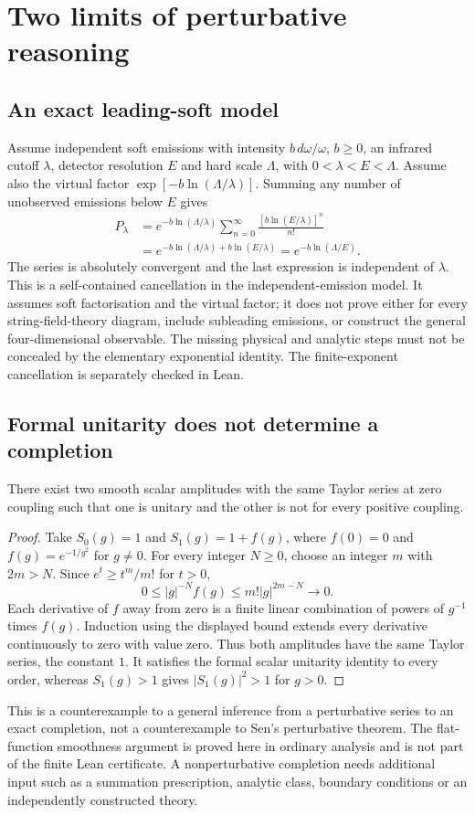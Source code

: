 \section{Two limits of perturbative reasoning}\label{app:perturbative}

\subsection{An exact leading-soft model}
Assume independent soft emissions with intensity $b\,d\omega/\omega$, $b\ge0$, an infrared cutoff $\lambda$, detector resolution $E$ and hard scale $\Lambda$, with $0<\lambda<E<\Lambda$. Assume also the virtual factor $\exp[-b\ln(\Lambda/\lambda)]$. Summing any number of unobserved emissions below $E$ gives
\begin{align}
P_\lambda&=e^{-b\ln(\Lambda/\lambda)}\sum_{n=0}^{\infty}
\frac{[b\ln(E/\lambda)]^n}{n!}\nonumber\\
&=e^{-b\ln(\Lambda/\lambda)+b\ln(E/\lambda)}
=e^{-b\ln(\Lambda/E)}.
\end{align}
The series is absolutely convergent and the last expression is independent of $\lambda$. This is a self-contained cancellation in the independent-emission model. It assumes soft factorisation and the virtual factor; it does not prove either for every string-field-theory diagram, include subleading emissions, or construct the general four-dimensional observable. The missing physical and analytic steps must not be concealed by the elementary exponential identity. The finite-exponent cancellation is separately checked in Lean.

\subsection{Formal unitarity does not determine a completion}
\begin{proposition}
There exist two smooth scalar amplitudes with the same Taylor series at zero coupling such that one is unitary and the other is not for every positive coupling.
\end{proposition}
\begin{proof}
Take $S_0(g)=1$ and $S_1(g)=1+f(g)$, where $f(0)=0$ and $f(g)=e^{-1/g^2}$ for $g\ne0$. For every integer $N\ge0$, choose an integer $m$ with $2m>N$. Since $e^t\ge t^m/m!$ for $t>0$,
\[
0\le |g|^{-N}f(g)\le m!|g|^{2m-N}\longrightarrow0.
\]
Each derivative of $f$ away from zero is a finite linear combination of powers of $g^{-1}$ times $f(g)$. Induction using the displayed bound extends every derivative continuously to zero with value zero. Thus both amplitudes have the same Taylor series, the constant $1$. It satisfies the formal scalar unitarity identity to every order, whereas $S_1(g)>1$ gives $|S_1(g)|^2>1$ for $g>0$.
\end{proof}
This is a counterexample to a general inference from a perturbative series to an exact completion, not a counterexample to Sen's perturbative theorem. The flat-function smoothness argument is proved here in ordinary analysis and is not part of the finite Lean certificate. A nonperturbative completion needs additional input such as a summation prescription, analytic class, boundary conditions or an independently constructed theory.
